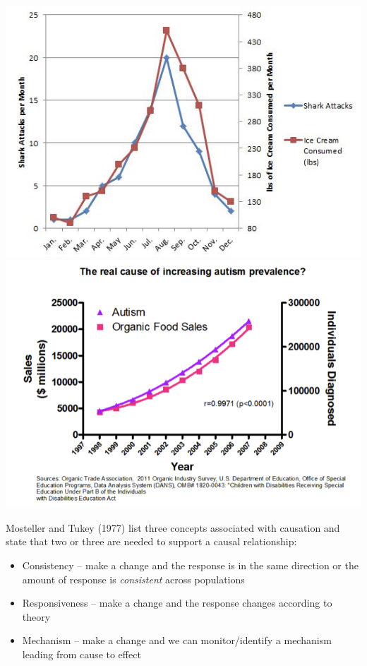 \documentclass[
]{book}
\providecommand{\tightlist}{%
  \setlength{\itemsep}{0pt}\setlength{\parskip}{0pt}}
\begin{document}
\includegraphics[width=7.44in]{images/IceCream_Shark}
\includegraphics[width=8.89in]{images/Autism_Organic}

Mosteller and Tukey (1977) list three concepts associated with causation and state that two or three are needed to support a causal relationship:

\begin{itemize}
\tightlist
\item
  Consistency -- make a change and the response is in the same direction or the amount of response is \emph{consistent} across populations
\item
  Responsiveness -- make a change and the response changes according to theory
\item
  Mechanism -- make a change and we can monitor/identify a mechanism leading from cause to effect
\end{itemize}
\end{document}
